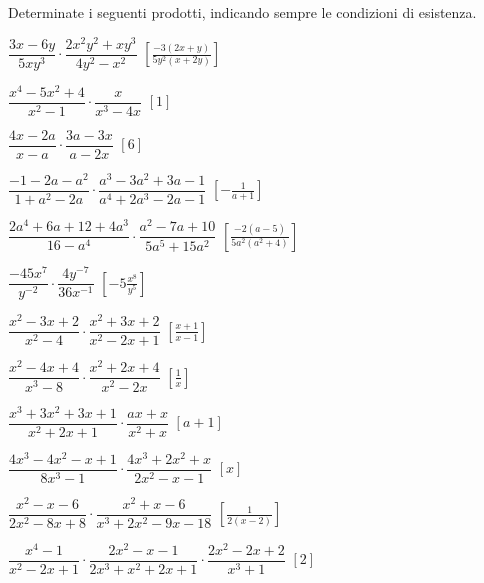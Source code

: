 \begin{esercizio}[\Ast]
\label{ese:19.13}
Determinate i seguenti prodotti, indicando sempre le condizioni di esistenza.
\begin{enumeratea}
 \item $\dfrac{3x-6y}{5xy^{3}}\cdot\dfrac{2x^{2}y^{2}+xy^{3}}{4y^{2}-x^{2}}$
 \hfill $\left[\frac{-{3(2x+y)}}{5y^{2}(x+2y)}\right]$
 \item $\dfrac{x^{4}-5x^{2}+4}{x^{2}-1}\cdot\dfrac{x}{x^{3}-4x}$
 \hfill $\left[1\right]$
 \item $\dfrac{4x-2a}{x-a}\cdot\dfrac{3a-3x}{a-2x}$
 \hfill $\left[6\right]$
 \item $\dfrac{-1-2a-a^{2}}{1+a^{2}-2a}\cdot
        \dfrac{a^{3}-3a^{2}+3a-1}{a^{4}+2a^{3}-2a-1}$
 \hfill $\left[-{\frac{1}{a+1}}\right]$
 \item $\dfrac{2a^{4}+6a+12+4a^{3}}{16-a^{4}}\cdot
        \dfrac{a^{2}-7a+10}{5a^{5}+15a^{2}}$
 \hfill $\left[\frac{-{2(a-5)}}{5a^{2}(a^{2}+4)}\right]$
 \item $\dfrac{-45x^{7}}{y^{-2}}\cdot\dfrac{4y^{-7}}{36x^{-1}}$
 \hfill $\left[-5\frac{x^{8}}{y^{5}}\right]$
 \item $\dfrac{x^{2}-3x+2}{x^{2}-4}\cdot\dfrac{x^{2}+3x+2}{x^{2}-2x+1}$
 \hfill $\left[\frac{x+1}{x-1}\right]$
 \item $\dfrac{x^{2}-4x+4}{x^{3}-8}\cdot\dfrac{x^{2}+2x+4}{x^{2}-2x}$
 \hfill $\left[\frac{1}{x}\right]$
 \item $\dfrac{x^{3}+3x^{2}+3x+1}{x^{2}+2x+1}\cdot \dfrac{ax+x}{x^{2}+x}$
 \hfill $\left[a+1\right]$
 \item $\dfrac{4x^{3}-4x^{2}-x+1}{8x^{3}-1}\cdot
        \dfrac{4x^{3}+2x^{2}+x}{2x^{2}-x-1}$
 \hfill $\left[x\right]$
 \item $\dfrac{x^{2}-x-6}{2x^{2}-8x+8}\cdot
        \dfrac{x^{2}+x-6}{x^{3}+2x^{2}-9x-18}$
 \hfill $\left[\frac{1}{2(x-2)}\right]$
 \item $\dfrac{x^{4}-1}{x^{2}-2x+1}\cdot
        \dfrac{2x^{2}-x-1}{2x^{3}+x^{2}+2x+1}\cdot
        \dfrac{2x^{2}-2x+2}{x^{3}+1}$
 \hfill $\left[2\right]$
\end{enumeratea}
\end{esercizio}

